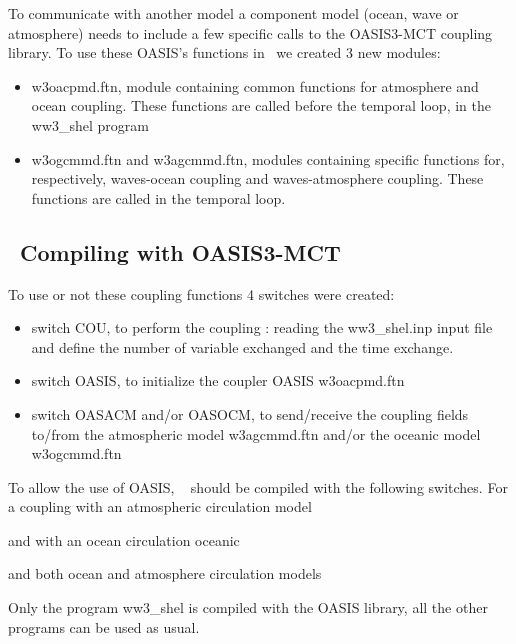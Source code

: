 To communicate with another model a component model (ocean, wave or atmosphere) needs to include a few specific calls to the OASIS3-MCT coupling library. To use these OASIS's functions in \ws\ we created 3 new modules:
\begin{itemize}
\item {\file w3oacpmd.ftn}, module containing common functions for atmosphere and ocean coupling. These functions are called before the temporal loop, in the {\code ww3\_shel} program
\item {\file w3ogcmmd.ftn} and {\file w3agcmmd.ftn}, modules containing specific functions for, respectively, waves-ocean coupling and waves-atmosphere coupling.  These functions are called in the temporal loop.
\end{itemize}

\vssub
\subsection{~Compiling with OASIS3-MCT} \label{sec:couplingB}
\vssub

To use or not these coupling functions 4 switches were created: 

\begin{itemize}
\item switch {\code COU}, to perform the coupling : reading the {\file ww3\_shel.inp} input file and define the number of variable exchanged and the time exchange.
\item switch {\code OASIS}, to initialize the coupler OASIS {\file w3oacpmd.ftn}
\item switch {\code OASACM} and/or {\code OASOCM}, to send/receive the coupling fields to/from the atmospheric model {\file w3agcmmd.ftn} and/or the oceanic model {\file w3ogcmmd.ftn}
\end{itemize}

To allow the use of OASIS, \ww~ should be compiled with the following switches. For 
a coupling with an atmospheric circulation model 


and with an ocean circulation oceanic


and both ocean and atmosphere circulation models 


Only the program {\code ww3\_shel} is compiled with the OASIS library, all the other programs can be used as usual. \\

